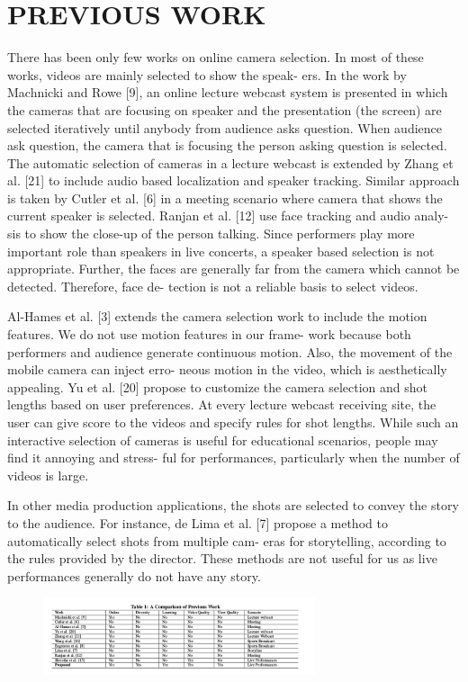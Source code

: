\documentclass{sig-alternate}
\begin{document}
\section{PREVIOUS WORK}
 There has been only few works on online camera selection. In
most of these works, videos are mainly selected to show the speak-
ers. In the work by Machnicki and Rowe [9], an online lecture
webcast system is presented in which the cameras that are focusing
on speaker and the presentation (the screen) are selected iteratively
until anybody from audience asks question. When audience ask
question, the camera that is focusing the person asking question is
selected. The automatic selection of cameras in a lecture webcast
is extended by Zhang et al. [21] to include audio based localization
and speaker tracking. Similar approach is taken by Cutler et al. [6]
in a meeting scenario where camera that shows the current speaker
is selected. Ranjan et al. [12] use face tracking and audio analy-
sis to show the close-up of the person talking. Since performers
play more important role than speakers in live concerts, a speaker
based selection is not appropriate. Further, the faces are generally
far from the camera which cannot be detected. Therefore, face de-
tection is not a reliable basis to select videos.\par
Al-Hames et al. [3] extends the camera selection work to include
the motion features. We do not use motion features in our frame-
work because both performers and audience generate continuous
motion. Also, the movement of the mobile camera can inject erro-
neous motion in the video, which is aesthetically appealing. Yu et
al. [20] propose to customize the camera selection and shot lengths
based on user preferences. At every lecture webcast receiving site,
the user can give score to the videos and specify rules for shot
lengths. While such an interactive selection of cameras is useful
for educational scenarios, people may find it annoying and stress-
ful for performances, particularly when the number of videos is
large.\par
In other media production applications, the shots are selected to
convey the story to the audience. For instance, de Lima et al. [7] propose a method to automatically select shots from multiple cam-
eras for storytelling, according to the rules provided by the director.
These methods are not useful for us as live performances generally
do not have any story.\par
\begin{figure}
\centering
\includegraphics[width=8cm]{second.png}
\end{figure}
\end{document}
